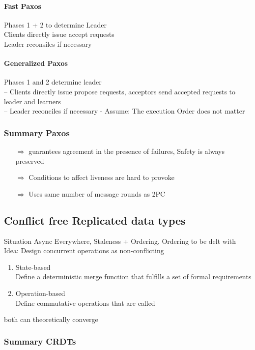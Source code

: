 \documentclass[a4paper,12pt]{article}%
\begin{document}
\paragraph{Fast Paxos}
Phases 1 + 2 to determine Leader\\
Clients directly issue accept requests\\
Leader reconsiles if necessary


\paragraph{Generalized Paxos}
Phases 1 and 2 determine leader\\
– Clients directly issue propose requests, acceptors send accepted requests to leader and learners\\
– Leader reconciles if necessary
- Assume: The execution Order does not matter

\subsubsection{Summary Paxos}
\begin{itemize}
	\item[$\Rightarrow$] guarantees agreement in the presence of failures, Safety is always preserved
	\item[$\Rightarrow$]  Conditions to affect liveness are hard to provoke
	\item[$\Rightarrow$]  Uses same number of message rounds as 2PC
\end{itemize}

\newpage
\subsection{Conflict free Replicated data types}
Situation Async Everywhere, Staleness + Ordering, Ordering to be delt with
Idea: Design concurrent operations as non-conflicting
\begin{enumerate}
	\item State-based\\Define a deterministic merge function that fulfills a set of formal requirements
	\item Operation-based \\ Define commutative operations that are called
\end{enumerate}
both can theoretically converge

\subsubsection{Summary CRDTs}
\end{document}
